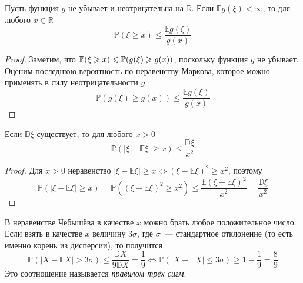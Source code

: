 \hypertarget{cheb}{}
\begin{crlr} 
Пусть функция $g$ не убывает и неотрицательна на $\mathbb{R}$. Если $\mathbb{E}g(\xi) < \infty$, то для любого $x \in \mathbb{R}$
\begin{equation*}
    \mathbb{P}(\xi \geqslant x) \leqslant \frac{\mathbb{E} g(\xi)}{g(x)}
\end{equation*}
\end{crlr}
\begin{proof}
    Заметим, что ${\mathbb{P}(\xi \geqslant x)} \leqslant {\mathbb{P}(g(\xi) \geqslant g(x))}$, поскольку функция $g$ не убывает. Оценим последнюю вероятность по неравенству Маркова, которое можно применять в силу неотрицательности $g$
    \begin{equation*}
        \mathbb{P}(g(\xi) \geqslant g(x)) \leqslant \frac{\mathbb{E} g(\xi)}{g(x)}
    \end{equation*}
\end{proof}
\begin{crlr}
    Если $\mathbb{D}\xi$ существует, то для любого $x > 0$
    \begin{equation*}
        \mathbb{P}(|\xi-\mathbb{E} \xi| \geqslant x) \leqslant \frac{\mathbb{D} \xi}{x^{2}}
    \end{equation*}
\end{crlr}
\begin{proof}
    Для $x > 0$ неравенство $|\xi - \mathbb{E}\xi| \geqslant x \Leftrightarrow (\xi - \mathbb{E}\xi)^2 \geqslant x^2$, поэтому
    \begin{equation*}
        \mathbb{P}(|\xi-\mathbb{E} \xi| \geqslant x)=\mathbb{P}\left((\xi-\mathbb{E} \xi)^{2} \geqslant x^{2}\right) \leqslant \frac{\mathbb{E}(\xi-\mathbb{E} \xi)^{2}}{x^{2}}=\frac{\mathbb{D} \xi}{x^{2}}
    \end{equation*}
\end{proof}
\begin{defn}
    В неравенстве Чебышёва в качестве $x$ можно брать любое положительное число. Если взять в качестве $x$ величину $3\sigma$, где $\sigma$~--- стандартное отклонение (то есть именно корень из дисперсии), то получится
    \begin{equation*}
        \mathbb{P}(|X-\mathbb{E} X|>3 \sigma) \leqslant \frac{\mathbb{D} X}{9 \mathbb{D} X}=\frac{1}{9} \Leftrightarrow \mathbb{P}(|X-\mathbb{E} X| \leqslant 3 \sigma) \geqslant 1-\frac{1}{9}=\frac{8}{9}
    \end{equation*}
    Это соотношение называется {\it правилом трёх сигм}.
\end{defn}

